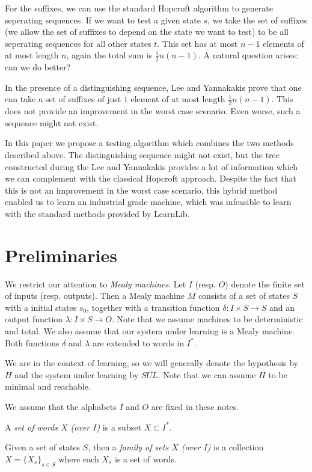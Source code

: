 \documentclass[envcountsame]{llncs}
\newcommand{\Def}[1]{\emph{#1}}
\begin{document}
For the suffixes, we can use the standard Hopcroft algorithm to generate
seperating sequences. If we want to test a given state $s$, we take the set of
suffixes (we allow the set of suffixes to depend on the state we want to test)
to be all seperating sequences for all other states $t$. This set has at most $n
-1$ elements of at most length $n$, again the total sum is $\frac{1}{2}n(n-1)$.
A natural question arises: can we do better?

In the presence of a distinguishing sequence, Lee and Yannakakis prove that one
can take a set of suffixes of just $1$ element of at most length $\frac{1}{2}n(n
-1)$. This does not provide an improvement in the worst case scenario. Even
worse, such a sequence might not exist.

In this paper we propose a testing algorithm which combines the two methods
described above. The distinguishing sequence might not exist, but the tree
constructed during the Lee and Yannakakis provides a lot of information which we
can complement with the classical Hopcroft approach. Despite the fact that this
is not an improvement in the worst case scenario, this hybrid method enabled us
to learn an industrial grade machine, which was infeasible to learn with the
standard methods provided by LearnLib.


\section{Preliminaries}

We restrict our attention to \Def{Mealy machines}. Let $I$ (resp. $O$) denote
the finite set of inputs (resp. outputs). Then a Mealy machine $M$ consists of a
set of states $S$ with a initial states $s_0$, together with a transition
function $\delta : I \times S \to S$ and an output function $\lambda : I \times
S \to O$. Note that we assume machines to be deterministic and total. We also
assume that our system under learning is a Mealy machine. Both functions $\delta
$ and $\lambda$ are extended to words in $I^\ast$.

We are in the context of learning, so we will generally denote the hypothesis by
$H$ and the system under learning by $SUL$. Note that we can assume $H$ to be
minimal and reachable.

We assume that the alphabets $I$ and $O$ are fixed in these notes.
\begin{definition}
	A \Def{set of words $X$ (over $I$)} is a subset $X \subset I^\ast$.

	Given a set of states $S$, then a \Def{family of sets $X$ (over $I$)} is a
	collection $X = \{X_s\}_{s \in S}$ where each $X_s$ is a set of words.
\end{definition}
\end{document}
